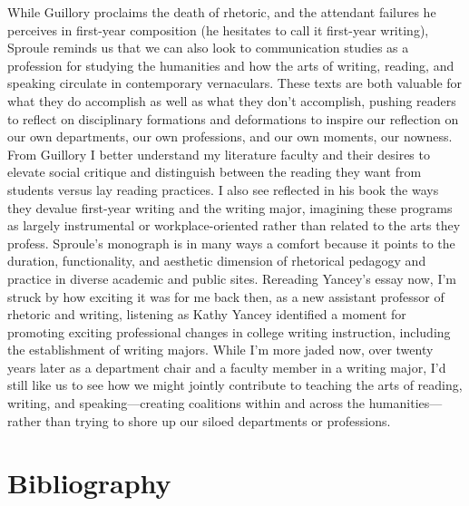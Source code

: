 \documentclass{tufte-handout}
\begin{document}
While Guillory proclaims the death of rhetoric, and the attendant
failures he perceives in first-year composition (he hesitates to call it
first-year writing), Sproule reminds us that we can also look to
communication studies as a profession for studying the humanities and
how the arts of writing, reading, and speaking circulate in contemporary
vernaculars. These texts are both valuable for what they do accomplish
as well as what they don't accomplish, pushing readers to reflect on
disciplinary formations and deformations to inspire our reflection on
our own departments, our own professions, and our own moments, our
nowness. From Guillory I better understand my literature faculty and
their desires to elevate social critique and distinguish between the
reading they want from students versus lay reading practices. I also see
reflected in his book the ways they devalue first-year writing and the
writing major, imagining these programs as largely instrumental or
workplace-oriented rather than related to the arts they profess.
Sproule's monograph is in many ways a comfort because it points to the
duration, functionality, and aesthetic dimension of rhetorical pedagogy
and practice in diverse academic and public sites. Rereading Yancey's
essay now, I'm struck by how exciting it was for me back then, as a new
assistant professor of rhetoric and writing, listening as Kathy Yancey
identified a moment for promoting exciting professional changes in
college writing instruction, including the establishment of writing
majors. While I'm more jaded now, over twenty years later as a
department chair and a faculty member in a writing major, I'd still like
us to see how we might jointly contribute to teaching the arts of
reading, writing, and speaking---creating coalitions within and across
the humanities---rather than trying to shore up our siloed departments
or professions.




\section{Bibliography}\label{bibliography}
\end{document}

